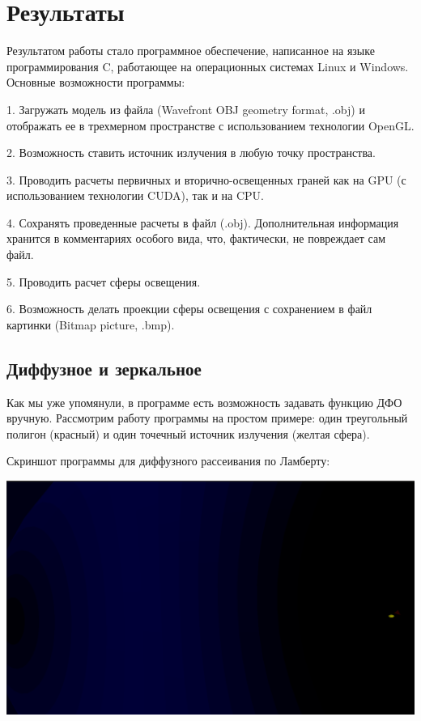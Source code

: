 \newpage
\section*{Результаты} 

Результатом работы стало программное обеспечение, написанное на языке программирования C, работающее на операционных системах Linux и Windows. Основные возможности программы:

1. Загружать модель из файла (Wavefront OBJ geometry format, .obj) и отображать ее в трехмерном пространстве с использованием технологии OpenGL.

2. Возможность ставить источник излучения в любую точку пространства.

3. Проводить расчеты первичных и вторично-освещенных граней как на GPU (с использованием технологии CUDA), так и на CPU.

4. Сохранять проведенные расчеты в файл (.obj). Дополнительная информация хранится в комментариях особого вида, что, фактически, не повреждает сам файл.

5. Проводить расчет сферы освещения.

6. Возможность делать проекции сферы освещения с сохранением в файл картинки (Bitmap picture, .bmp).

\subsection*{Диффузное и зеркальное}

Как мы уже упомянули, в программе есть возможность задавать функцию ДФО вручную. Рассмотрим работу программы на простом примере: один треугольный полигон (красный) и один точечный источник излучения (желтая сфера). 

Скриншот программы для диффузного рассеивания по Ламберту:

\includegraphics[width=1\linewidth]{lambert-screen.png}

